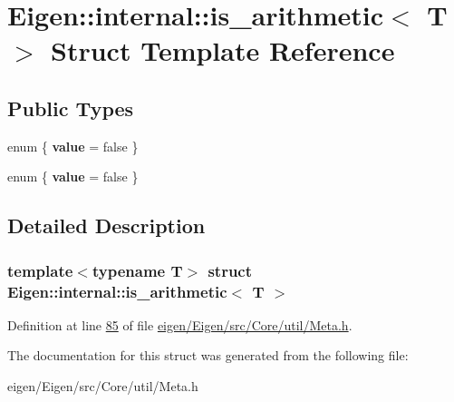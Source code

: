 \hypertarget{struct_eigen_1_1internal_1_1is__arithmetic}{}\section{Eigen\+:\+:internal\+:\+:is\+\_\+arithmetic$<$ T $>$ Struct Template Reference}
\label{struct_eigen_1_1internal_1_1is__arithmetic}
\subsection*{Public Types}
\begin{DoxyCompactItemize}
\item 
\mbox{\label{struct_eigen_1_1internal_1_1is__arithmetic_a2ff05c4a8bde348e8610e041924a38bb}} 
enum \{ {\bfseries value} = false
 \}
\item 
\mbox{\label{struct_eigen_1_1internal_1_1is__arithmetic_ad4dbf58b5442e27332711ad8bd0f8888}} 
enum \{ {\bfseries value} = false
 \}
\end{DoxyCompactItemize}


\subsection{Detailed Description}
\subsubsection*{template$<$typename T$>$\newline
struct Eigen\+::internal\+::is\+\_\+arithmetic$<$ T $>$}



Definition at line \hyperlink{eigen_2_eigen_2src_2_core_2util_2_meta_8h_source_l00085}{85} of file \hyperlink{eigen_2_eigen_2src_2_core_2util_2_meta_8h_source}{eigen/\+Eigen/src/\+Core/util/\+Meta.\+h}.



The documentation for this struct was generated from the following file\+:\begin{DoxyCompactItemize}
\item 
eigen/\+Eigen/src/\+Core/util/\+Meta.\+h\end{DoxyCompactItemize}
